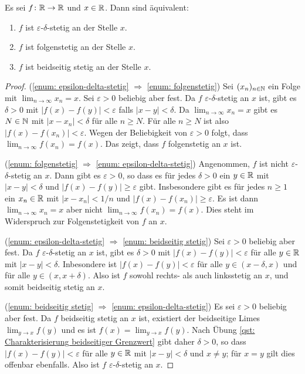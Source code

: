 \documentclass[a4paper,10pt]{article}
\begin{document}
\begin{prop}
 Es sei $f \colon \mathbb{R} \to \mathbb{R}$ und $x \in \mathbb{R}$. Dann sind äquivalent:
 \begin{enumerate}
  \item\label{enum: epsilon-delta-stetig}
   $f$ ist $\varepsilon$-$\delta$-stetig an der Stelle $x$.
  \item\label{enum: folgenstetig}
   $f$ ist folgenstetig an der Stelle $x$.
  \item\label{enum: beidseitig stetig}
   $f$ ist beidseitig stetig an der Stelle $x$.
 \end{enumerate}
\end{prop}
\begin{proof}
 (\ref{enum: epsilon-delta-stetig} $\Rightarrow$ \ref{enum: folgenstetig})
 Sei $(x_n)_{n \in \mathbb{N}}$ ein Folge mit $\lim_{n \to \infty} x_n = x$. Sei $\varepsilon > 0$ beliebig aber fest. Da $f$ $\varepsilon$-$\delta$-stetig an $x$ ist, gibt es $\delta > 0$ mit $|f(x)-f(y)| < \varepsilon$ falls $|x-y| < \delta$. Da $\lim_{n \to \infty} x_n = x$ gibt es $N \in \mathbb{N}$ mit $|x-x_n| < \delta$ für alle $n \geq N$. Für alle $n \geq N$ ist also $|f(x)-f(x_n)| < \varepsilon$. Wegen der Beliebigkeit von $\varepsilon > 0$ folgt, dass $\lim_{n \to \infty} f(x_n) = f(x)$. Das zeigt, dass $f$ folgenstetig an $x$ ist.

 (\ref{enum: folgenstetig} $\Rightarrow$ \ref{enum: epsilon-delta-stetig})
 Angenommen, $f$ ist nicht $\varepsilon$-$\delta$-stetig an $x$. Dann gibt es $\varepsilon > 0$, so dass es für jedes $\delta > 0$ ein $y \in \mathbb{R}$ mit $|x-y| < \delta$ und $|f(x)-f(y)| \geq \varepsilon$ gibt. Insbesondere gibt es für jedes $n \geq 1$ ein $x_n \in \mathbb{R}$ mit $|x - x_n| < 1/n$ und $|f(x) - f(x_n)| \geq \varepsilon$. Es ist dann $\lim_{n \to \infty} x_n = x$ aber nicht $\lim_{n \to \infty} f(x_n) = f(x)$. Dies steht im Widerspruch zur Folgenstetigkeit von $f$ an $x$.
 
 (\ref{enum: epsilon-delta-stetig} $\Rightarrow$ \ref{enum: beidseitig stetig})
 Sei $\varepsilon > 0$ beliebig aber fest. Da $f$ $\varepsilon$-$\delta$-stetig an $x$ ist, gibt es $\delta > 0$ mit $|f(x)-f(y)| < \varepsilon$ für alle $y \in \mathbb{R}$ mit $|x-y| < \delta$. Inbesondere ist $|f(x)-f(y)| < \varepsilon$ für alle $y \in (x-\delta,x)$ und für alle $y \in (x,x+\delta)$. Also ist $f$ sowohl rechts- als auch linksstetig an $x$, und somit beidseitig stetig an $x$.
 
 (\ref{enum: beidseitig stetig} $\Rightarrow$ \ref{enum: epsilon-delta-stetig})
 Es sei $\varepsilon > 0$ beliebig aber fest. Da $f$ beidseitig stetig an $x$ ist, existiert der beidseitige Limes $\lim_{y \to x} f(y)$ und es ist $f(x) = \lim_{y \to x} f(y)$. Nach Übung \ref{qst: Charakterisierung beidseitiger Grenzwert} gibt daher $\delta > 0$, so dass $|f(x)-f(y)| < \varepsilon$ für alle $y \in \mathbb{R}$ mit $|x-y| < \delta$ und $x \neq y$; für $x = y$ gilt dies offenbar ebenfalls. Also ist $f$ $\varepsilon$-$\delta$-stetig an $x$.
\end{proof}
\end{document}
